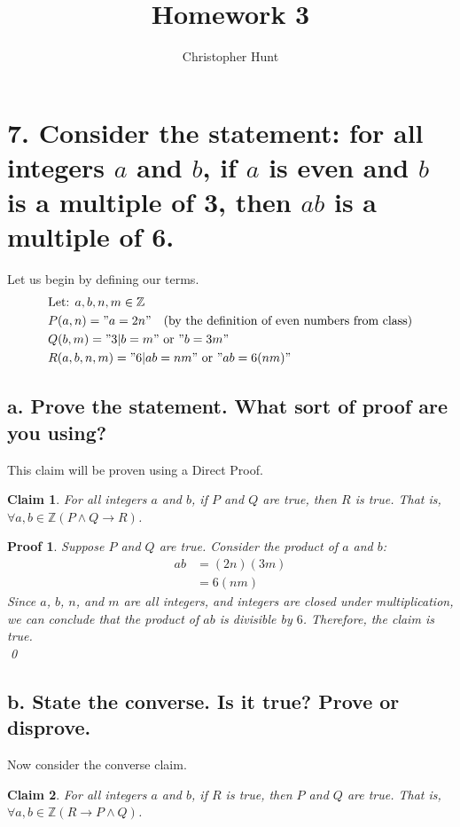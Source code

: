 \documentclass{article}
\title{Homework 3}
\author{Christopher Hunt}
\date{}
\newtheorem*{claim}{Claim}
\newtheorem*{myproof}{Proof}
\begin{document}
\pagestyle{fancy}
\fancyhf{}
\rhead{\thepage}
\maketitle
\section*{7. Consider the statement: for all integers $a$ and $b$, if $a$ is even and $b$ is a multiple of 3, then $ab$ is a multiple of 6.}
Let us begin by defining our terms.
\begin{align*}
    &\text{Let: } a,b,n,m\in\mathbb{Z} \\
    &P(a,n) = "a = 2n" \quad \text{(by the definition of even numbers from class)} \\
    &Q(b,m) = "3|b=m" \text{ or } "b=3m" \\
    &R(a,b,n,m)= "6|ab=nm" \text{ or } "ab = 6(nm)"
\end{align*}
\subsection*{a. Prove the statement. What sort of proof are you using?}
This claim will be proven using a Direct Proof.
\begin{claim}
For all integers $a$ and $b$, if $P$ and $Q$ are true, then $R$ is true. That is, $\forall a, b \in \mathbb{Z} (P \wedge Q \rightarrow R)$.
\end{claim}

\begin{myproof}
Suppose $P$ and $Q$ are true. Consider the product of $a$ and $b$:
\begin{align*}
    ab &= (2n)(3m) \\
       &= 6(nm)
\end{align*}
Since $a$, $b$, $n$, and $m$ are all integers, and integers are closed under multiplication, we can conclude that the product of $ab$ is divisible by $6$. Therefore, the claim is true. \\
\qed
\end{myproof}


\subsection*{b. State the converse. Is it true? Prove or disprove.}
Now consider the converse claim.
\begin{claim}
For all integers $a$ and $b$, if $R$ is true, then $P$ and $Q$ are true. That is, $\forall a, b \in \mathbb{Z} (R \rightarrow P \wedge Q)$.
\end{claim}
\end{document}
